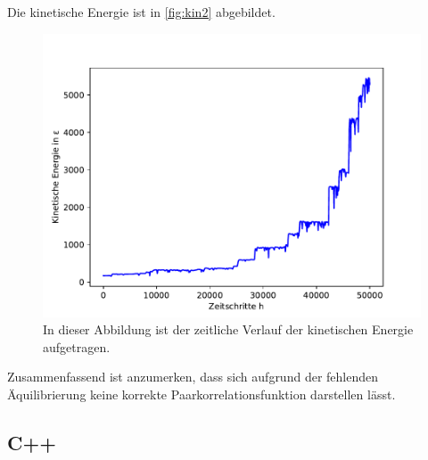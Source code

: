 Die kinetische Energie ist in \autoref{fig:kin2} abgebildet.
\begin{figure}[H]
    \centering
    \includegraphics[scale=0.5]{MolDyn/Big Boy/kinetic_energy.pdf}
    \caption{In dieser Abbildung ist der zeitliche Verlauf der kinetischen Energie aufgetragen.}
    \label{fig:kin2}
\end{figure}
Zusammenfassend ist anzumerken, dass sich aufgrund der fehlenden Äquilibrierung keine korrekte Paarkorrelationsfunktion darstellen lässt.
\newpage

\subsection{C++}